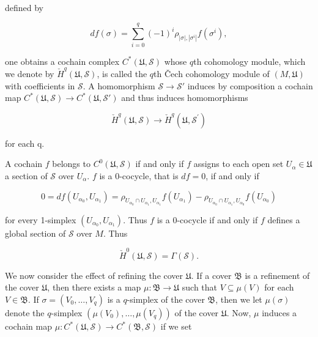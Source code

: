 defined by

\begin{equation}
\tag{3}\label{eq:5.33:3}
d f(\sigma)=\sum_{i=0}^{q}(-1)^{i}\rho_{|\sigma|,|\sigma^{i}|}f(\sigma^{i}),
\end{equation}

one obtains a cochain complex $C^{*}(\mathfrak{U},\mathcal{S})$ whose $q$th cohomology module, which we denote by $\check{H}^{q}(\mathfrak{U},\mathcal{S})$, is called the $q$th Čech cohomology module of $(M,\mathfrak{U})$ with coefficients in $\mathcal{S}$. A homomorphism $\mathcal{S}\to\mathcal{S}'$ induces by composition a cochain map $C^{*}(\mathfrak{U},\mathcal{S})\to C^{*}(\mathfrak{U},\mathcal{S}')$ and thus induces homomorphisms

\begin{equation}
\tag{4}\label{eq:5.33:4}
\check{H}^{q}(\mathfrak{U},\mathcal{S})\to\check{H}^{q}(\mathfrak{U},\mathcal{S}^{\prime})
\end{equation}

for each q.

A cochain $f$ belongs to $C^0(\mathfrak{U},\mathcal{S})$ if and only if $f$ assigns to each open set $U_\alpha\in\mathfrak{U}$ a section of $\mathcal{S}$ over $U_\alpha$. $f$ is a 0-cocycle, that is $df=0$, if and only if

\begin{equation}
\tag{5}\label{eq:5.33:5}
0=d f(U_{\alpha_{0}},U_{\alpha_{1}})=\rho_{U_{\alpha_{0}}\cap U_{\alpha_{1}},U_{\alpha_{1}}}f(U_{\alpha_{1}})-\rho_{U_{\alpha_{0}}\cap U_{\alpha_{1}},U_{\alpha_{0}}}f(U_{\alpha_{0}})
\end{equation}

for every 1-simplex $(U_{\alpha_0}, U_{\alpha_1})$. Thus $f$ is a 0-cocycle if and only if $f$ defines a global section of $\mathcal{S}$ over $M$. Thus

\begin{equation}
\tag{6}\label{eq:5.33:6}
\check{H}^{0}(\mathfrak{U},\mathcal{S})=\Gamma(\mathcal{S}).
\end{equation}

We now consider the effect of refining the cover $\mathfrak{U}$. If a cover $\mathfrak{B}$ is a refinement of the cover $\mathfrak{U}$, then there exists a map $\mu\colon\mathfrak{B}\to\mathfrak{U}$ such that $V \subseteq \mu(V)$ for each $V \in \mathfrak{B}$. If $\sigma = (V_0, \ldots, V_q)$ is a $q$-simplex of the cover $\mathfrak{B}$, then we let $\mu(\sigma)$ denote the $q$-simplex $(\mu(V_0), \ldots, \mu(V_q))$ of the cover $\mathfrak{U}$. Now, $\mu$ induces a cochain map $\mu: C^*(\mathfrak{U},\mathcal{S}) \to C^*(\mathfrak{B},\mathcal{S})$ if we set

